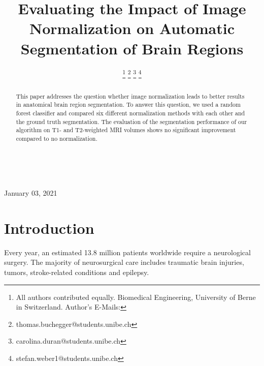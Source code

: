 \documentclass[article]{IEEEtran}
\begin{document}

\title{Evaluating the Impact of Image Normalization on Automatic Segmentation of Brain Regions}

\author{ 
\and {} 
\and {} 
\thanks{All authors contributed equally. Biomedical Engineering, University of Berne in Switzerland. Author's E-Mails:}%
\thanks{thomas.buchegger@students.unibe.ch}%
\thanks{carolina.duran@students.unibe.ch}%
\thanks{stefan.weber1@students.unibe.ch}}

\\
\maketitle
\newpage



\begin{abstract}
	This paper addresses the question whether image normalization leads to better results in anatomical brain region segmentation. 
	To answer this question, we used a random forest classifier and compared six different normalization methods with each other and the ground truth segmentation. 
	The evaluation of the segmentation performance of our algorithm on T1- and T2-weighted MRI volumes shows no significant improvement compared to no normalization. 
\end{abstract}
\hfill January 03, 2021


\section{Introduction}

	Every year, an estimated 13.8 million patients worldwide require a neurological surgery. The majority of neurosurgical care includes traumatic brain injuries, tumors, stroke-related conditions and epilepsy. \cite{Dewan2019}
	
\end{document}
